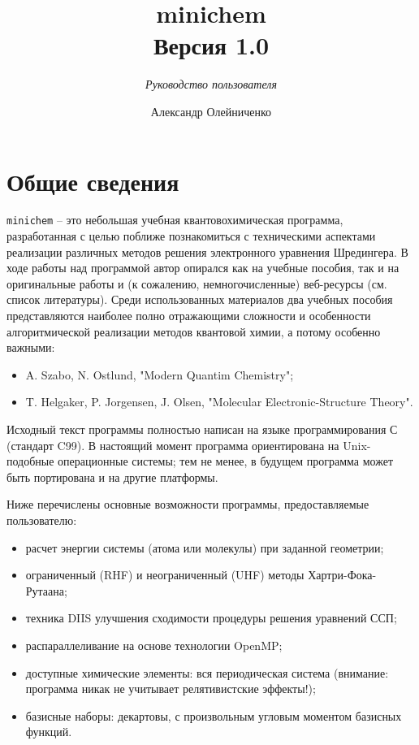 \documentclass[a4paper, 12pt]{article}
\title{{\bf minichem} \\ \bigskip \normalsize Версия 1.0 }
\author{Александр Олейниченко}
\subtitle{\textit{Руководство пользователя}}
\begin{document}
\maketitle

\tableofcontents

\section{Общие сведения}

\texttt{minichem} -- это небольшая учебная квантовохимическая программа, разработанная с целью поближе познакомиться с техническими аспектами реализации различных методов решения электронного уравнения Шредингера. В ходе работы над программой автор опирался как на учебные пособия, так и на оригинальные работы и (к сожалению, немногочисленные) веб-ресурсы (см. список литературы). Среди использованных материалов два учебных пособия представляются наиболее полно отражающими сложности и особенности алгоритмической реализации методов квантовой химии, а потому особенно важными:

\begin{itemize}
\item \cite{szabo1996} A. Szabo, N. Ostlund, "Modern Quantim Chemistry";
\item \cite{helgaker2008} T. Helgaker, P. Jorgensen, J. Olsen, "Molecular Electronic-Structure Theory".
\end{itemize}

Исходный текст программы полностью написан на языке программирования С (стандарт C99). В настоящий момент программа ориентирована на Unix-подобные операционные системы; тем не менее, в будущем программа может быть портирована и на другие платформы.

Ниже перечислены основные возможности программы, предоставляемые пользователю:

\begin{itemize}
\item расчет энергии системы (атома или молекулы) при заданной геометрии;
\item ограниченный (RHF) и неограниченный (UHF) методы Хартри-Фока-Рутаана;
\item техника DIIS улучшения сходимости процедуры решения уравнений ССП;
\item распараллеливание на основе технологии OpenMP;
\item доступные химические элементы: вся периодическая система (внимание: программа никак не учитывает релятивистские эффекты!);
\item базисные наборы: декартовы, с произвольным угловым моментом базисных функций.
\end{itemize}
\end{document}
